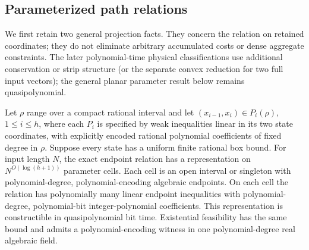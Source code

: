 \subsection{Parameterized path relations}\label{s5:parameter-paths}

We first retain two general projection facts. They concern the relation
on retained coordinates; they do not eliminate arbitrary accumulated
costs or dense aggregate constraints.
The later polynomial-time physical classifications use additional
conservation or strip structure (or the separate convex reduction for
two full input vectors); the general planar parameter result below
remains quasipolynomial.

\begin{theorem}
\label{s5:quasipoly-path}
Let $\rho$ range over a compact rational interval and let
$(x_{i-1},x_i)\in P_i(\rho)$, $1\le i\le h$, where each $P_i$ is
specified by weak inequalities linear in its two state coordinates,
with explicitly encoded rational polynomial coefficients of fixed
degree in $\rho$. Suppose every state has a uniform finite rational
box bound. For input length $N$, the exact endpoint relation has a
representation on $N^{O(\log(h+1))}$ parameter cells. Each cell is an
open interval or singleton with polynomial-degree, polynomial-encoding
algebraic endpoints. On each cell the relation has polynomially many
linear endpoint inequalities with polynomial-degree, polynomial-bit
integer-polynomial coefficients. This representation is constructible
in quasipolynomial bit time. Existential feasibility has the same bound
and admits a polynomial-encoding witness in one polynomial-degree real
algebraic field.
\end{theorem}
